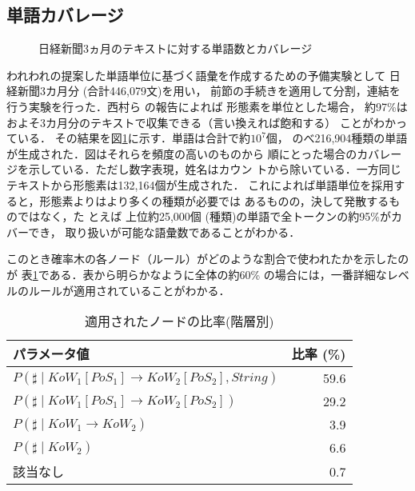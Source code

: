 \subsection{単語カバレージ}
\begin{figure}[htb]
\begin{center}
  \caption{日経新聞3ヵ月のテキストに対する単語数とカバレージ}
  \label{FIG:COVERAGE}
\end{center}
\end{figure}
われわれの提案した単語単位に基づく語彙を作成するための予備実験として
日経新聞3カ月分 (合計446,079文)を用い，
前節の手続きを適用して分割，\mbox{連結を行う実験を行った．西村ら}
の報告\cite{NISIMURA}によれば
形態素を単位とした場合，
\mbox{約97\%はおよそ3カ月分のテ}キストで収集できる（言い換えれば飽和する）
ことがわかっている．
\mbox{その結果を図\ref{FIG:COVERAGE}に示す．単}語は合計で約$10^{7}$個，
のべ216,904種類の単語が生成された．図はそれらを頻度の高いのものから
順にとった場合のカバレージを示している．ただし数字表現，姓名はカウン
トから除いている．一方同じテキストから形態素は132,164個が生成された．
これによれば単語単位を採用す\break
ると，形態素よりはより多くの種類が必要では
あるものの，決して発散するものではなく，た\break
とえば
上位約25,000個
(種類)の単語で全トークンの約95\%がカバーでき，
\mbox{取り扱いが可能な語}彙数であることがわかる．
\par
このとき確率木の各ノード（ルール）がどのような割合で使われたかを示したのが
表\ref{TBL:USEDRULE}である．表から明らかなように全体の約60\%
の場合には，一番詳細なレベルのルールが適用されていることがわかる．
\begin{table}[htb]
\begin{center}
\caption{適用されたノードの比率(階層別)}
\label{TBL:USEDRULE}
\begin{tabular}{lr} \hline
  パラメータ値                                              & 
比率 (\%)\\ \hline
  $P(\sharp \mid KoW_{1}[PoS_{1}] \rightarrow KoW_{2}[PoS_{2}], String)$     &
59.6 \\
  $P(\sharp \mid KoW_{1}[PoS_{1}] \rightarrow KoW_{2}[PoS_{2}])$             &
29.2 \\
  $P(\sharp \mid KoW_{1} \rightarrow KoW_{2})$     &  3.9 \\
  $P(\sharp \mid KoW_{2})$                         &  6.6 \\
  該当なし                            &  0.7 \\ \hline
\end{tabular}
\end{center}
\end{table}
